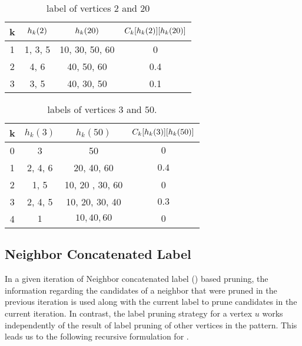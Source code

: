 \begin{table}[h]
    \centering
    \begin{tabular}{|c|c|c|c|}
        \hline
        k & $h_{k}(2)$ & $h_{k}(20)$ & $C_{k}[h_{k}(2)][h_{k}(20)]$\\
        \hline
        1 & 1, 3, 5 & 10, 30, 50, 60 & 0 \\
        2 & 4, 6 & 40, 50, 60 & 0.4 \\
        3 & 3, 5 & 40, 30, 50 & 0.1\\
        \hline
    \end{tabular}
    \caption{\khop label of vertices $2$ and $20$}
    \label{tab:khop220}
\end{table}

\begin{table}[h]
    \centering
    \begin{tabular}{|c|c|c|c|}
        \hline
        k & $h_k(3)$ & $h_k(50)$ & $C_{k}[h_{k}(3)][h_{k}(50)]$ \\
        \hline
        0 & 3 & 50 & $0$\\
        1 & 2, 4, 6 & 20, 40, 60 & $0.4$ \\
        2 & 1, 5 & 10, 20 , 30, 60 & 0\\
        3 & 2, 4, 5 & 10, 20, 30, 40 & $0.3$ \\
        4 & $1$ & $10, 40, 60$ & $0$ \\
        \hline
    \end{tabular}
    \caption{\khop labels of vertices $3$ and $50$.}
    \label{tab:khop350}
\end{table}



\subsection{Neighbor Concatenated Label} 
In a given iteration of Neighbor concatenated label (\ncl) based pruning,
the information regarding the candidates of a neighbor that were pruned 
in the previous iteration is used along with the current \khop label to
prune candidates in the current iteration. In contrast, the \khop label
pruning strategy for a vertex $u$ works independently of the result of
\khop label pruning of other vertices in the pattern. This leads us
to the following recursive formulation for \ncl.

